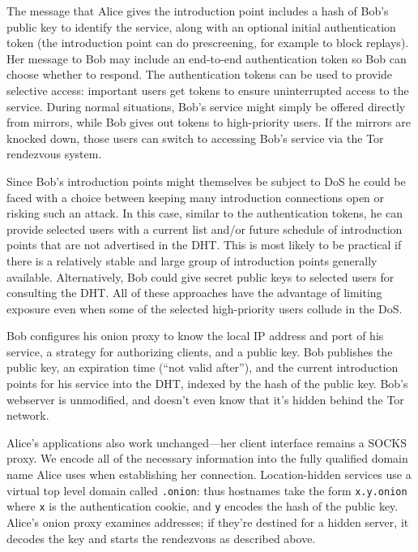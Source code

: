 \documentclass[times,10pt,twocolumn]{article}
\begin{document}
The message that Alice gives
the introduction point includes a hash of Bob's public key to identify
the service, along with an optional initial authentication token (the
introduction point can do prescreening, for example to block replays). Her
message to Bob may include an end-to-end authentication token so Bob
can choose whether to respond.
The authentication tokens can be used to provide selective access:
important users get tokens to ensure uninterrupted access to the
service. During normal situations, Bob's service might simply be offered
directly from mirrors, while Bob gives out tokens to high-priority users. If
the mirrors are knocked down,
those users can switch to accessing Bob's service via
the Tor rendezvous system.

Since Bob's introduction points might themselves be subject to DoS he
could be faced with a choice between keeping many
introduction connections open or risking such an attack. In this case,
similar to the authentication tokens, he can provide selected users
with a current list and/or future schedule of introduction points that
are not advertised in the DHT\@. This is most likely to be practical
if there is a relatively stable and large group of introduction points
generally available. Alternatively, Bob could give secret public keys
to selected users for consulting the DHT\@. All of these approaches
have the advantage of limiting exposure even when
some of the selected high-priority users collude in the DoS\@.


Bob configures his onion proxy to know the local IP address and port of his
service, a strategy for authorizing clients, and a public key. Bob
publishes the public key, an expiration time (``not valid after''), and
the current introduction points for his service into the DHT, indexed
by the hash of the public key.  Bob's webserver is unmodified,
and doesn't even know that it's hidden behind the Tor network.

Alice's applications also work unchanged---her client interface
remains a SOCKS proxy. We encode all of the necessary information
into the fully qualified domain name Alice uses when establishing her
connection. Location-hidden services use a virtual top level domain
called {\tt .onion}: thus hostnames take the form {\tt x.y.onion} where
{\tt x} is the authentication cookie, and {\tt y} encodes the hash of
the public key. Alice's onion proxy
examines addresses; if they're destined for a hidden server, it decodes
the key and starts the rendezvous as described above.
\end{document}
